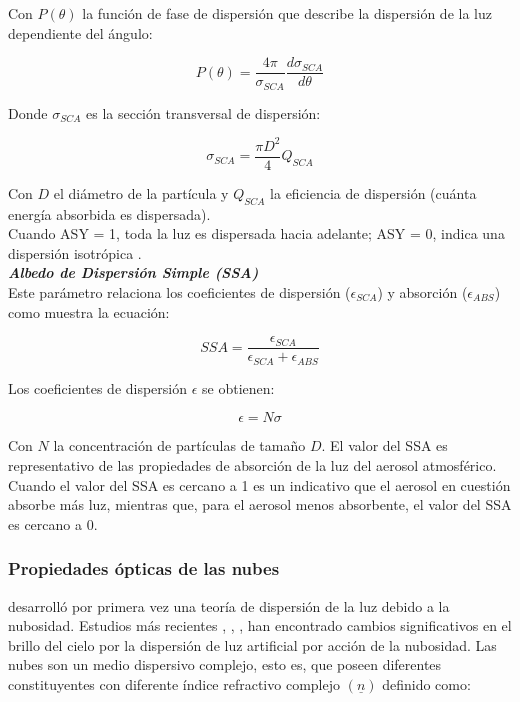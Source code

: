 Con $P(\theta)$ la función de fase de dispersión que describe la dispersión de la luz dependiente del ángulo:

\begin{equation}
P(\theta) = \frac{4\pi}{\sigma_{SCA}} \frac{d\sigma_{SCA}}{d\theta}
\end{equation}

Donde $\sigma_{SCA}$ es la sección transversal de dispersión:

\begin{equation}
\sigma_{SCA} = \frac{\pi D^{2}}{4} Q_{SCA}
\end{equation}

Con $D$ el diámetro de la partícula y $Q_{SCA}$ la eficiencia de dispersión (cuánta energía absorbida es dispersada).\\

Cuando ASY = 1, toda la luz es dispersada hacia adelante; ASY = 0, indica una dispersión isotrópica \citep{Solano2015}.
\\

\textit{\textbf{Albedo de Dispersión Simple (SSA)}}\\

Este parámetro relaciona los coeficientes de dispersión ($\epsilon_{SCA}$) y absorción ($\epsilon_{ABS}$) \citep{Foot1987} como muestra la ecuación:

\begin{equation}
SSA = \frac{\epsilon_{SCA}}{\epsilon_{SCA} + \epsilon_{ABS}}
\end{equation}


Los coeficientes de dispersión $\epsilon$ se obtienen:

\begin{equation}
\epsilon = N \sigma
\end{equation}

Con $N$ la concentración de partículas de tamaño $D$. El valor del SSA es representativo de las propiedades de absorción de la luz del aerosol atmosférico. Cuando el valor del SSA es cercano a 1 es un indicativo que el aerosol en cuestión absorbe más luz, mientras que, para el aerosol menos absorbente, el valor del SSA es cercano a 0.\\

\subsubsection{Propiedades ópticas de las nubes}

\cite{Twomey1967} desarrolló por primera vez una teoría de dispersión de la luz debido a la nubosidad. Estudios más recientes \citep{Kocifaj2007}, \citep{Solano2014}, \citep{Solano2015}, han encontrado cambios significativos en el brillo del cielo por la dispersión de luz artificial por acción de la nubosidad. Las nubes son un medio dispersivo complejo, esto es, que poseen diferentes constituyentes con diferente índice refractivo complejo $(\underline{n})$ definido como:

